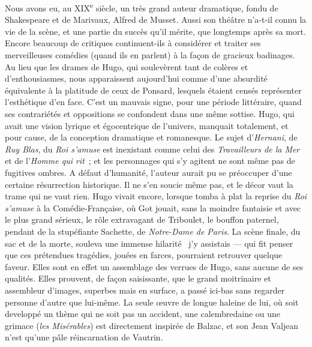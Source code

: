 \documentclass[french,twoside]{book} %
\begin{document}
Nous avons eu, au XIX\textsuperscript{e} siècle, un très grand auteur dramatique, fondu de Shakespeare et de Marivaux, Alfred de Musset. Aussi son théâtre n’a-t-il connu la vie de la scène, et une partie du succès qu’il mérite, que longtemps après sa mort. Encore beaucoup de critiques continuent-ils à considérer et traiter ses merveilleuses comédies (quand ils en parlent) à la façon de gracieux badinages. Au lieu que les drames de Hugo, qui soulevèrent tant de colères et d’enthousiasmes, nous apparaissent aujourd’hui comme d’une absurdité équivalente à la platitude de ceux de Ponsard, lesquels étaient censés représenter l’esthétique d’en face. C’est un mauvais signe, pour une période littéraire, quand ses contrariétés et oppositions se confondent dans une même sottise. Hugo, qui avait une vision lyrique et égocentrique de l’univers, manquait totalement, et pour cause, de la conception dramatique et romanesque. Le sujet d’{\itshape Hernani}, de {\itshape Ruy Blas}, du {\itshape Roi s’amuse} est inexistant comme celui des {\itshape Travailleurs de la Mer} et de l’{\itshape Homme qui rit} ; et les personnages qui s’y agitent ne sont même pas de fugitives ombres. A défaut d’humanité, l’auteur aurait pu se préoccuper d’une certaine résurrection historique. Il ne s’en soucie même pas, et le décor vaut la trame qui ne vaut rien. Hugo vivait encore, lorsque tomba à plat la reprise du {\itshape Roi s’amuse} à la Comédie-Française, où Got jouait, sans la moindre fantaisie et avec le plus grand sérieux, le rôle extravagant de Triboulet, le bouffon paternel, pendant de la stupéfiante Sachette, de {\itshape Notre-Dame de Paris}. La scène finale, du sac et de la morte, souleva une immense hilarité  j’y assistais — qui fit penser que ces prétendues tragédies, jouées en farces, pourraient retrouver quelque faveur. Elles sont en effet un assemblage des verrues de Hugo, sans aucune de ses qualités. Elles prouvent, de façon saisissante, que le grand moitrinaire et assembleur d’images, superbes mais en surface, a passé ici-bas sans regarder personne d’autre que lui-même. La seule œuvre de longue haleine de lui, où soit developpé un thème qui ne soit pas un accident, une calembredaine ou une grimace ({\itshape les Misérables}) est directement inspirée de Balzac, et son Jean Valjean n’est qu’une pâle réincarnation de Vautrin.\par
\end{document}
